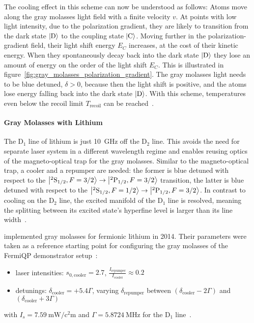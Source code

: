 The cooling effect in this scheme can now be understood as follows: Atoms move along the gray molasses light field with a finite velocity $v$. At points with low light intensity, due to the polarization gradient, they are likely to transition from the dark state $\Ket{\text{D}}$ to the coupling state $\Ket{\text{C}}$. Moving further in the polarization-gradient field, their light shift energy $E_C$ increases, at the cost of their kinetic energy. When they spontaneously decay back into the dark state $\Ket{\text{D}}$ they lose an amount of energy on the order of the light shift $E_C$. This is illustrated in figure~\ref{fig:gray_molasses_polarization_gradient}. The gray molasses light needs to be blue detuned, $\delta > 0$, because then the light shift is positive, and the atoms lose energy falling back into the dark state $\Ket{\text{D}}$. With this scheme,  temperatures even below the recoil limit $T_\text{recoil}$ can be reached~\cite{weidemuller_novel_1994,gerken_gray_2016}.


\paragraph{Gray Molasses with Lithium} The D$_1$ line of lithium is just \SI{10}{\giga\hertz} off the D$_2$ line. This avoids the need for separate laser system in a different wavelength regime and  enables reusing optics of the magneto-optical trap for the gray molasses. Similar to the magneto-optical trap, a cooler and a repumper are needed: the former is blue detuned with respect to the $\Ket{^2\text{S}_{1/2}, F = 3/2} \rightarrow \Ket{^2\text{P}_{1/2}, F = 3/2}$ transition, the latter is blue detuned with respect to the $\Ket{^2\text{S}_{1/2}, F = 1/2} \rightarrow \Ket{^2\text{P}_{1/2}, F = 3/2}$. In contrast to cooling on the D$_2$ line, the excited manifold of the D$_1$ line is resolved, meaning the splitting between its excited state's hyperfine level is larger than its line width~\cite{gerken_gray_2016}.

\citeauthor{burchianti_efficient_2014} implemented gray molasses for fermionic lithium in 2014. Their parameters were taken as a reference starting point for configuring the gray molasses of the FermiQP demonstrator setup~\cite{burchianti_efficient_2014}:
\begin{itemize}
    \item laser intensities: $s_{0, \text{cooler}} = 2.7$, $\frac{I_\text{repumper}}{I_\text{cooler}} \approx 0.2$
    \item detunings: $\delta_\text{cooler} = +5.4 \Gamma$, varying $\delta_\text{repumper}$ between $(\delta_\text{cooler} -2 \Gamma)$ and  $(\delta_\text{cooler}+ 3\Gamma)$
\end{itemize}
with $I_s = \SI{7.59}{\milli\watt\per\square\centi\meter}$ and $\Gamma = \SI{5.8724}{\mega\hertz}$ for the D$_1$ line~\cite{gehm_properties_2003}.

